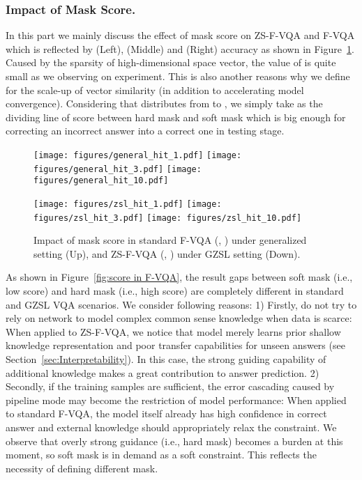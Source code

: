 \documentclass[runningheads]{llncs}
\begin{document}
\subsubsection{Impact of Mask Score.} \label{sec:Impact of mask score}
In this part we mainly discuss the effect of mask score on ZS-F-VQA and F-VQA which is reflected by  (Left),  (Middle) and  (Right) accuracy as shown in Figure~\ref{fig:score in ZS-F-VQA}.
Caused by the sparsity of high-dimensional space vector, the value of  is quite small as we observing on experiment. 
This is also another reasons why we define  for the scale-up of vector similarity (in addition to accelerating model convergence).
Considering that  distributes from  to , we simply take  as the dividing line of score between hard mask and soft mask which is big enough for correcting an incorrect answer into a correct one in testing stage.
\begin{figure}[htbp]
\centering
\texttt{[image: figures/general\_hit\_1.pdf]} 
\texttt{[image: figures/general\_hit\_3.pdf]}
\texttt{[image: figures/general\_hit\_10.pdf]}

\texttt{[image: figures/zsl\_hit\_1.pdf]} 
\texttt{[image: figures/zsl\_hit\_3.pdf]}
\texttt{[image: figures/zsl\_hit\_10.pdf]}
\caption{Impact of mask score in standard F-VQA (, ) under generalized setting (Up), and ZS-F-VQA (, ) under GZSL setting (Down).}
\label{fig:score in F-VQA}
\label{fig:score in ZS-F-VQA}
\end{figure}
As shown in Figure~\ref{fig:score in F-VQA}, the result gaps between soft mask (i.e., low score) and hard mask (i.e., high score)  are completely different in standard and GZSL VQA scenarios.
We consider following reasons:
1) Firstly, do not try to rely on network to model complex common sense knowledge when data is scarce: 
When applied to ZS-F-VQA, we notice that model merely learns prior shallow knowledge representation and poor transfer capabilities for unseen answers (see Section~\ref{sec:Interpretability}). In this case, the strong guiding capability of additional knowledge makes a great contribution to answer prediction.
2) Secondly, if the training samples are sufficient, the error cascading caused by pipeline mode may become the restriction of model performance: 
When applied to standard F-VQA, the model itself already has high confidence in correct answer and external knowledge should appropriately relax the constraint. 
We observe that overly strong guidance (i.e., hard mask) becomes a burden at this moment, so soft mask is in demand as a soft constraint.
This reflects the necessity of defining different mask.
\end{document}

